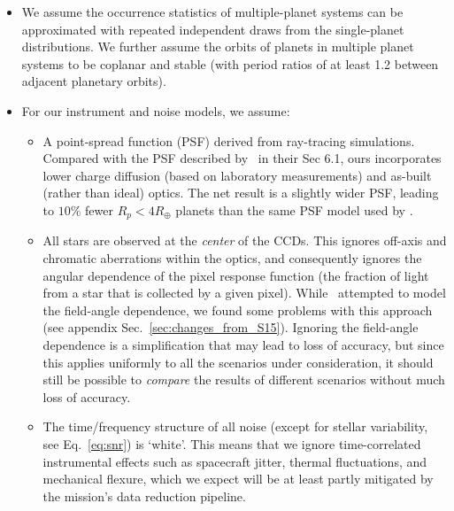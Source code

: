 \begin{itemize}
	\item We assume the occurrence statistics of multiple-planet systems 	
		  can be approximated with repeated independent draws from the 
		  single-planet distributions. We further assume the orbits of planets 
		  in multiple planet systems to be 
		  coplanar and stable (with period ratios of at least 1.2 between 
		  adjacent planetary orbits).
          
	\item For our instrument and noise models, we assume:
	  \begin{itemize}
            
	  \item A point-spread function (PSF) derived from ray-tracing
            simulations.
            Compared with the PSF described by~ in 
            their Sec 6.1, ours incorporates lower charge diffusion (based on 
            laboratory measurements) and as-built (rather than ideal) optics.
            The net result is a slightly wider PSF, leading to $10\%$ fewer 
            $R_p<4R_\oplus$ planets than
            the same PSF model used by .
            
          \item All stars are observed at the \textit{center} of the
            \tess CCDs. This ignores off-axis and chromatic
            aberrations within the \tess optics, and consequently
            ignores the angular dependence of the pixel response
            function (the fraction of light from a star that is
            collected by a given pixel).
            While~ attempted to model the
            field-angle dependence, we found some problems with this approach (see appendix
            Sec.~\ref{sec:changes_from_S15}).  
            Ignoring the field-angle dependence is a simplification that may 
            lead to loss of accuracy, but since this applies uniformly to all 
            the scenarios under consideration, it should still be possible
            to {\it compare} the results of different scenarios
            without much loss of accuracy.
            
         \item The time/frequency structure of all noise (except for
           stellar variability, see Eq.~\ref{eq:snr}) is `white'.  
           This means that we ignore time-correlated instrumental effects 
           such as spacecraft jitter, thermal fluctuations, and mechanical
           flexure, which we expect will be at least partly mitigated
           by the mission's data reduction pipeline.
                  

\end{itemize}
\end{itemize}
